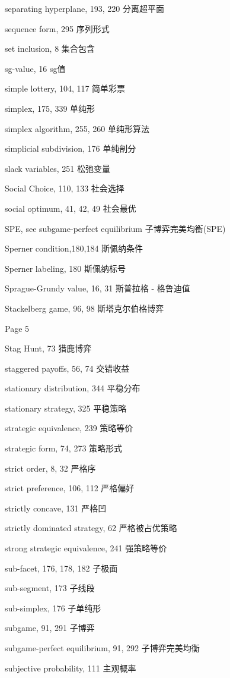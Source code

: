 separating hyperplane, 193, 220 分离超平面


sequence form, 295 序列形式


set inclusion, 8 集合包含


sg-value, 16 sg值


simple lottery, 104, 117 简单彩票


simplex, 175, 339 单纯形


simplex algorithm, 255, 260 单纯形算法


simplicial subdivision, 176 单纯剖分


slack variables, 251 松弛变量


Social Choice, 110, 133 社会选择


social optimum, 41, 42, 49 社会最优

SPE, see subgame-perfect equilibrium 子博弈完美均衡(SPE)


Sperner condition,180,184 斯佩纳条件


Sperner labeling, 180 斯佩纳标号


Sprague-Grundy value, 16, 31 斯普拉格 - 格鲁迪值


Stackelberg game, 96, 98 斯塔克尔伯格博弈


Page 5

Stag Hunt, 73 猎鹿博弈  

staggered payoffs, 56, 74 {\color{blue}交错收益  }

stationary distribution, 344 平稳分布  

stationary strategy, 325 平稳策略  

strategic equivalence, 239 策略等价  

strategic form, 74, 273 策略形式  

strict order, 8, 32 严格序  

strict preference, 106, 112 严格偏好  

strictly concave, 131 严格凹  

strictly dominated strategy, 62 严格被占优策略  

strong strategic equivalence, 241 强策略等价  

sub-facet, 176, 178, 182 {\color{blue}子极面}  

sub-segment, 173 子线段  

sub-simplex, 176 子单纯形  

subgame, 91, 291 子博弈  

subgame-perfect equilibrium, 91, 292 子博弈完美均衡  

subjective probability, 111 主观概率  

